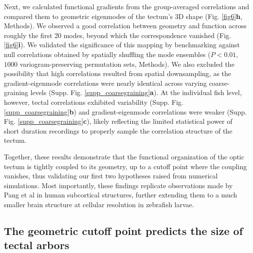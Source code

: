 \documentclass{article}
\begin{document}
Next, we calculated functional gradients from the group-averaged correlations and compared them to geometric eigenmodes of the tectum’s 3D shape (Fig. \ref{fig6}\textbf{h}, Methods). We observed a good correlation between geometry and function across roughly the first 20 modes, beyond which the correspondence vanished (Fig. \ref{fig6}\textbf{i}). We validated the significance of this mapping by benchmarking against null correlations obtained by spatially shuffling the mode ensembles ($P<0.01$, $1000$ variogram-preserving permutation sets\cite{burt2020generative}, Methods). We also excluded the possibility that high correlations resulted from spatial downsampling, as the gradient-eigenmode correlations were nearly identical across varying coarse-graining levels (Supp. Fig. \ref{supp_coarsegraining}\textbf{a}). At the individual fish level, however, tectal correlations exhibited variability (Supp. Fig. \ref{supp_coarsegraining}\textbf{b}) and gradient-eigenmode correlations were weaker (Supp. Fig. \ref{supp_coarsegraining}\textbf{c}), likely reflecting the limited statistical power of short duration recordings to properly sample the correlation structure of the tectum.

Together, these results demonstrate that the functional organization of the optic tectum is tightly coupled to its geometry, up to a cutoff point where the coupling vanishes, thus validating our first two hypotheses raised from numerical simulations. Most importantly, these findings replicate observations made by Pang et al in human subcortical structures\cite{pang2023geometric}, further extending them to a much smaller brain structure at cellular resolution in zebrafish larvae.

\subsection*{The geometric cutoff point predicts the size of tectal arbors}
\end{document}

